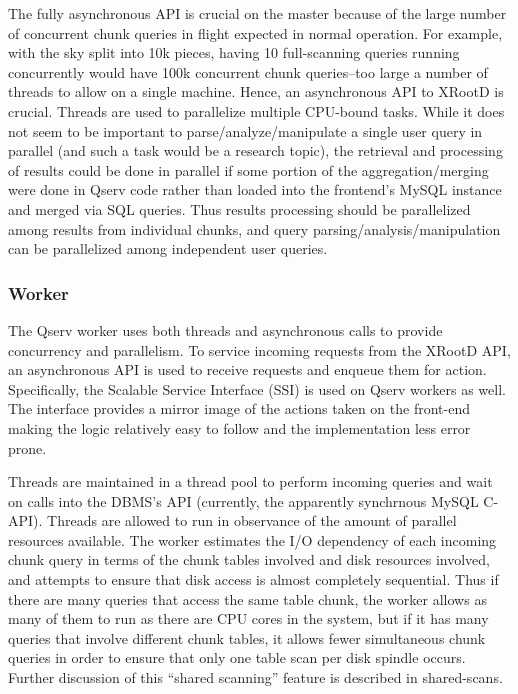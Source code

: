 \documentclass[DM,lsstdraft,toc]{lsstdoc}
\begin{document}
The fully asynchronous API is crucial on the master because of the large
number of concurrent chunk queries in flight expected in normal
operation. For example, with the sky split into 10k pieces, having 10
full-scanning queries running concurrently would have 100k concurrent
chunk queries--too large a number of threads to allow on a single
machine. Hence, an asynchronous API to XRootD
is crucial. Threads are used to parallelize multiple CPU-bound tasks.
While it does not seem to be important to parse/analyze/manipulate a
single user query in parallel (and such a task would be a research
topic), the retrieval and processing of results could be done in
parallel if some portion of the aggregation/merging were done in Qserv
code rather than loaded into the frontend's MySQL instance and merged
via SQL queries. Thus results processing should be parallelized among
results from individual chunks, and query parsing/analysis/manipulation
can be parallelized among independent user queries.

\subsubsection{Worker}\label{worker}

The Qserv worker uses both threads and asynchronous calls to provide
concurrency and parallelism. To service incoming requests from the
XRootD API, an asynchronous API is used to
receive requests and enqueue them for action. Specifically, the Scalable
Service Interface (SSI) is used on Qserv workers as well. The
interface provides a mirror image of the actions taken on the front-end
making the logic relatively easy to follow and the implementation less
error prone.

Threads are maintained in a thread pool to perform incoming queries and
wait on calls into the DBMS's API (currently, the apparently synchrnous
MySQL C-API). Threads are allowed to run in observance of the amount of
parallel resources available. The worker estimates the I/O dependency of
each incoming chunk query in terms of the chunk tables involved and disk
resources involved, and attempts to ensure that disk access is almost
completely sequential. Thus if there are many queries that access the
same table chunk, the worker allows as many of them to run as there are
CPU cores in the system, but if it has many queries that involve
different chunk tables, it allows fewer simultaneous chunk queries in
order to ensure that only one table scan per disk spindle occurs.
Further discussion of this ``shared scanning'' feature is described in
shared-scans.
\end{document}
